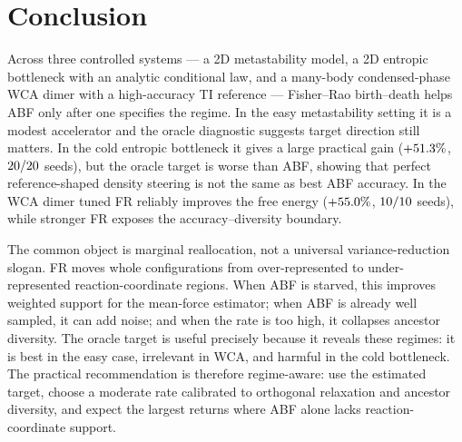 \section{Conclusion}
\label{sec:conclusion}

Across three controlled systems --- a 2D metastability model, a 2D entropic
bottleneck with an analytic conditional law, and a many-body condensed-phase WCA
dimer with a high-accuracy TI reference --- Fisher--Rao birth--death helps ABF
only after one specifies the regime. In the easy metastability setting it is a
modest accelerator and the oracle diagnostic suggests target direction still
matters. In the cold entropic bottleneck it gives a large practical gain
($+51.3\%$, $20/20$ seeds), but the oracle target is worse than
ABF, showing that perfect reference-shaped density steering is not the same as
best ABF accuracy. In the WCA dimer tuned FR reliably improves the free energy
($+55.0\%$, $10/10$ seeds), while stronger FR exposes the
accuracy--diversity boundary.

The common object is marginal reallocation, not a universal variance-reduction
slogan. FR moves whole configurations from over-represented to under-represented
reaction-coordinate regions. When ABF is starved, this improves weighted support
for the mean-force estimator; when ABF is already well sampled, it can add noise;
and when the rate is too high, it collapses ancestor diversity. The oracle target
is useful precisely because it reveals these regimes: it is best in the easy case,
irrelevant in WCA, and harmful in the cold bottleneck. The practical recommendation
is therefore regime-aware: use the estimated target, choose a moderate rate
calibrated to orthogonal relaxation and ancestor diversity, and expect the largest
returns where ABF alone lacks reaction-coordinate support.
